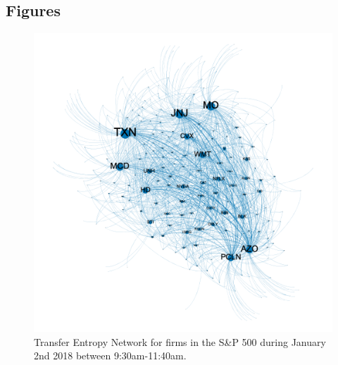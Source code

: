 \subsection{Figures}
\begin{figure}[!htb]
  \centerline{\includegraphics[scale=0.6]{figures/PredIF/Networks/figures/20180102-1sec-1of3.png}}
  \caption{Transfer Entropy Network for firms in the S\&P 500 during January 2nd 2018 between 9:30am-11:40am. }
  \label{fig:20180102-1sec-1of3}
\end{figure}

